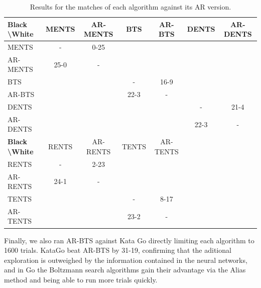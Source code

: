     \begin{table}[]
    \centering
        \begin{tabular}{l|cccccc}
            \textbf{Black \textbackslash White}     & MENTS     & AR-MENTS  & BTS       & AR-BTS    & DENTS     & AR-DENTS  \\ 
            \hline
                                    MENTS           &   -       & 0-25      &           &           &           &           \\
                                    AR-MENTS        & 25-0      &   -       &           &           &           &           \\
                                    BTS             &           &           &   -       & 16-9      &           &           \\
                                    AR-BTS          &           &           & 22-3      &   -       &           &           \\
                                    DENTS           &           &           &           &           &   -       & 21-4      \\
                                    AR-DENTS        &           &           &           &           & 22-3      & -         \\      
            \hline
            \textbf{Black \textbackslash White}     & RENTS     & AR-RENTS  & TENTS     & AR-TENTS  &           &           \\ 
            \hline
                                    RENTS           &   -       & 2-23      &           &           &           &           \\
                                    AR-RENTS        & 24-1      &   -       &           &           &           &           \\
                                    TENTS           &           &           &   -       & 8-17      &           &           \\
                                    AR-TENTS        &           &           & 23-2      & -         &           &           \\         
        \end{tabular}
        \caption{Results for the matches of each algorithm against its AR version.\label{tab:y10}}
    \end{table}
    
    
    
    Finally, we also ran AR-BTS against Kata Go directly limiting each algorithm to 1600 trials. KataGo beat AR-BTS by 31-19, confirming that the aditional exploration is outweighed by the information contained in the neural networks, and in Go the Boltzmann search algorithms gain their advantage via the Alias method and being able to run more trials quickly.


